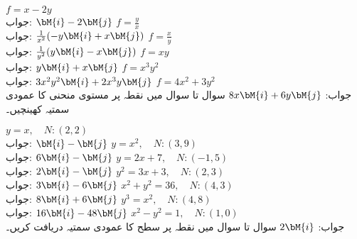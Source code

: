 \quad
$f=x-2y$\\
جواب:\quad
$\bM{i}-2\bM{j}$
\quad
$f=\frac{y}{x}$\\
جواب:\quad
$\frac{1}{x^2}(-y\bM{i}+x\bM{j})$
\quad
$f=\frac{x}{y}$\\
جواب:\quad
$\frac{1}{y^2}(y\bM{i}-x\bM{j})$
\quad
$f=xy$\\
جواب:\quad
$y\bM{i}+x\bM{j}$
\quad
$f=x^3y^2$\\
جواب:\quad
$3x^2y^2\bM{i}+2x^3y\bM{j}$
\quad
$f=4x^2+3y^2$\\
جواب:\quad
$8x\bM{i}+6y\bM{j}$
سوال  تا سوال  میں نقطہ  پر  مستوی منحنی کا عمودی سمتیہ کھینچیں۔

\quad
$y=x,\quad N:(2,2)$\\
جواب:\quad
$\bM{i}-\bM{j}$
\quad
$y=x^2,\quad N:(3,9)$\\
جواب:\quad
$6\bM{i}-\bM{j}$
\quad
$y=2x+7,\quad N:(-1,5)$\\
جواب:\quad
$2\bM{i}-\bM{j}$
\quad
$y^2=3x+3,\quad N:(2,3)$\\
جواب:\quad
$3\bM{i}-6\bM{j}$
\quad
$x^2+y^2=36,\quad N:(4,3)$\\
جواب:\quad
$8\bM{i}+6\bM{j}$
\quad
$y^3=x^2,\quad N:(4,8)$\\
جواب:\quad
$16\bM{i}-48\bM{j}$
\quad
$x^2-y^2=1,\quad N:(1,0)$\\
جواب:\quad
$2\bM{i}$
سوال  تا سوال  میں نقطہ  پر  سطح کا عمودی سمتیہ دریافت کریں۔

